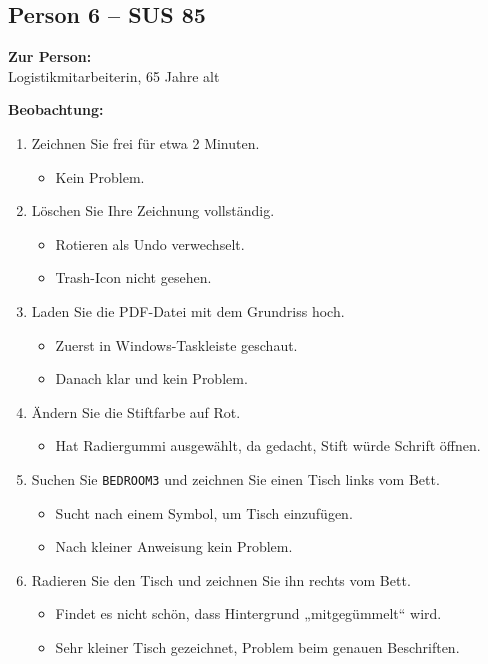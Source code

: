 \subsection{Person 6 – SUS 85}  
\textbf{Zur Person:}\\
Logistikmitarbeiterin, 65 Jahre alt  

\textbf{Beobachtung:}  
\begin{enumerate}
    \item Zeichnen Sie frei für etwa 2 Minuten.
    \begin{itemize}
        \item Kein Problem.
    \end{itemize}

    \item Löschen Sie Ihre Zeichnung vollständig.
    \begin{itemize}
        \item Rotieren als Undo verwechselt.  
        \item Trash-Icon nicht gesehen.
    \end{itemize}

    \item Laden Sie die PDF-Datei mit dem Grundriss hoch.
    \begin{itemize}
        \item Zuerst in Windows-Taskleiste geschaut.  
        \item Danach klar und kein Problem.
    \end{itemize}

    \item Ändern Sie die Stiftfarbe auf Rot.
    \begin{itemize}
        \item Hat Radiergummi ausgewählt, da gedacht, Stift würde Schrift öffnen.
    \end{itemize}

    \item Suchen Sie \texttt{BEDROOM3} und zeichnen Sie einen Tisch links vom Bett.
    \begin{itemize}
        \item Sucht nach einem Symbol, um Tisch einzufügen.  
        \item Nach kleiner Anweisung kein Problem.
    \end{itemize}

    \item Radieren Sie den Tisch und zeichnen Sie ihn rechts vom Bett.
    \begin{itemize}
        \item Findet es nicht schön, dass Hintergrund „mitgegümmelt“ wird.  
        \item Sehr kleiner Tisch gezeichnet, Problem beim genauen Beschriften.  
    \end{itemize}


\end{enumerate}
